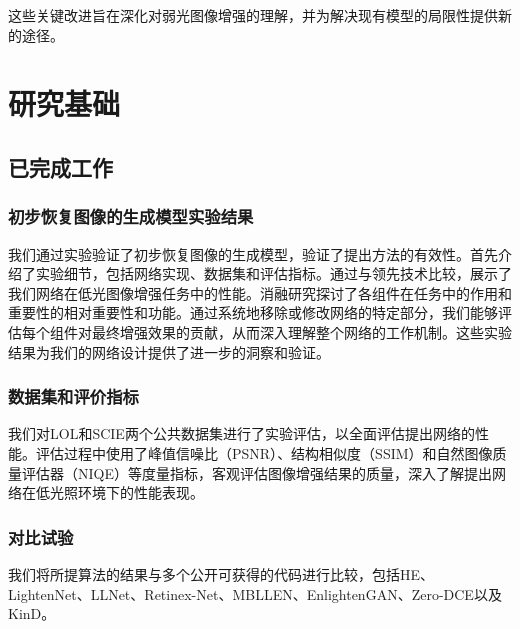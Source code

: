 \documentclass[a4paper]{ctexart}
\begin{document}
	这些关键改进旨在深化对弱光图像增强的理解，并为解决现有模型的局限性提供新的途径。
	
	\section{研究基础}
	
	\subsection{已完成工作}
	
	\subsubsection{初步恢复图像的生成模型实验结果}
	
	我们通过实验验证了初步恢复图像的生成模型，验证了提出方法的有效性。首先介绍了实验细节，包括网络实现、数据集和评估指标。通过与领先技术比较，展示了我们网络在低光图像增强任务中的性能。消融研究探讨了各组件在任务中的作用和重要性的相对重要性和功能。通过系统地移除或修改网络的特定部分，我们能够评估每个组件对最终增强效果的贡献，从而深入理解整个网络的工作机制。这些实验结果为我们的网络设计提供了进一步的洞察和验证。
	
	\subsubsection{数据集和评价指标}
	
	我们对LOL\cite{wei2018deep}和SCIE\cite{cai2018learning}两个公共数据集进行了实验评估，以全面评估提出网络的性能。评估过程中使用了峰值信噪比（PSNR）\cite{wang2004image}、结构相似度（SSIM）\cite{wang2004image}和自然图像质量评估器（NIQE）\cite{mittal2012making}等度量指标，客观评估图像增强结果的质量，深入了解提出网络在低光照环境下的性能表现。
	
	\subsubsection{对比试验}
	
	我们将所提算法的结果与多个公开可获得的代码进行比较，包括HE\cite{pisano1998contrast}、LightenNet\cite{li2018lightennet}、LLNet\cite{lore2017llnet}、Retinex-Net\cite{wei2018deep}、MBLLEN\cite{lv2018mbllen}、EnlightenGAN\cite{jiang2021enlightengan}、Zero-DCE\cite{guo2020zero}以及KinD\cite{zhang2019kindling}。
	
\end{document}

